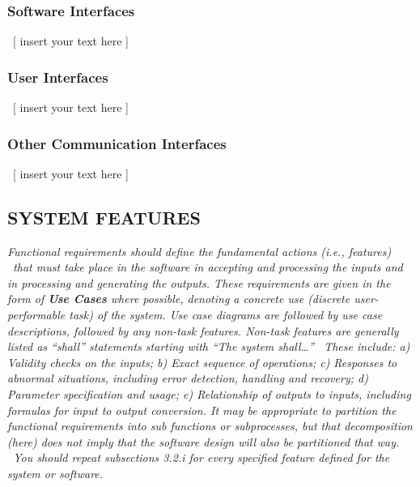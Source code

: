\documentclass[twoside,letterpaper]{article}
\begin{document}
\subsubsection[Software
Interfaces]{\rmfamily\bfseries\color{black}
Software Interfaces}
{\color{black}
\foreignlanguage{english}{\ }\foreignlanguage{english}{[ insert your
text here ]}}

\subsubsection[User
Interfaces]{\rmfamily\bfseries\color{black}
User Interfaces}
{\color{black}
\foreignlanguage{english}{\ }\foreignlanguage{english}{[ insert your
text here ]}}

\subsubsection[Other Communication
Interfaces]{\rmfamily\bfseries\color{black}
Other Communication Interfaces}
{\color{black}
\foreignlanguage{english}{\ }\foreignlanguage{english}{[ insert your
text here ]}}


\bigskip


\bigskip

\bigskip

\clearpage\pagestyle{Standard}
\subsection[SYSTEM
FEATURES]{\rmfamily\bfseries\color{black}
SYSTEM FEATURES}
{\itshape\color{black}
Functional requirements should define the fundamental actions (i.e.,
features) \ that must take place in the software in accepting and
processing the inputs and in processing and generating the outputs.
These requirements are given in the form of \textbf{Use Cases} where
possible, denoting a concrete use (discrete user-performable task) of
the system. Use case diagrams are followed by use case descriptions,
followed by any non-task features. Non-task features are generally
listed as {\textquotedblleft}shall{\textquotedblright} statements
starting with {\textquotedblleft}The system
shall{\dots}{\textquotedblright} \ These include: a) Validity checks on
the inputs; b) Exact sequence of operations; c) Responses to abnormal
situations, including error detection, handling and recovery; d)
Parameter specification and usage; e) Relationship of outputs to
inputs, including formulas for input to output conversion. \newline
\newline
It may be appropriate to partition the functional requirements into sub
functions or subprocesses, but that decomposition (here) does not imply
that the software design will also be partitioned that way. \ You
should repeat subsections 3.2.i for every specified feature defined for
the system or software.}
\end{document}
